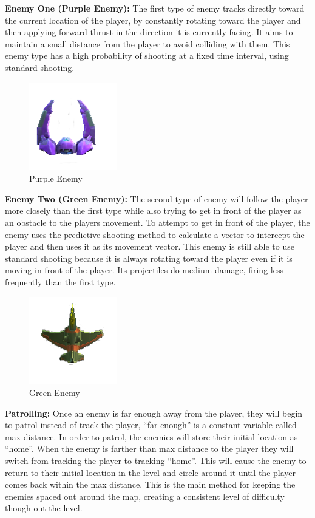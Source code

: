 \documentclass[12pt]{article}       %
\begin{document}
	{\bf Enemy One (Purple Enemy):} The first type of enemy tracks directly toward the current location of the player, by constantly rotating toward the player and then applying forward thrust in the direction it is currently facing. It aims to maintain a small distance from the player to avoid colliding with them. This enemy type has a high probability of shooting at a fixed time interval, using standard shooting. \\

\begin{figure} [H]\centering  \includegraphics[width=1.5in]{PurpleEnemy.png} \caption{Purple Enemy} \label{EnemyOne} \end{figure}

	{\bf Enemy Two (Green Enemy):} The second type of enemy will follow the player more closely than the first type while also trying to get in front of the player as an obstacle to the players movement. To attempt to get in front of the player, the enemy uses the predictive shooting method to calculate a vector to intercept the player and then uses it as its movement vector. This enemy is still able to use standard shooting because it is always rotating toward the player even if it is moving in front of the player. Its projectiles do medium damage, firing less frequently than the first type. \\

\begin{figure} [H]\centering  \includegraphics[width=1.5in]{GreenEnemy.png} \caption{Green Enemy} \label{EnemyTwo} \end{figure} 

	{\bf Patrolling:} Once an enemy is far enough away from the player, they will begin to patrol instead of track the player, ``far enough” is a constant variable called max distance. In order to patrol, the enemies will store their initial location as ``home''. When the enemy is farther than max distance to the player they will switch from tracking the player to tracking ``home”. This will cause the enemy to return to their initial location in the level and circle around it until the player comes back within the max distance. This is the main method for keeping the enemies spaced out around the map, creating a consistent level of difficulty though out the level. \\
\end{document}
